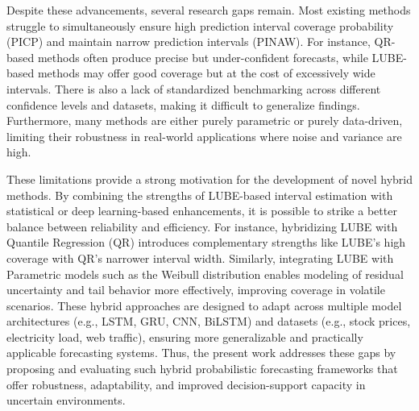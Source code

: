 Despite these advancements, several research gaps remain. Most existing methods struggle to simultaneously ensure high prediction interval coverage probability (PICP) and maintain narrow prediction intervals (PINAW). For instance, QR-based methods often produce precise but under-confident forecasts, while LUBE-based methods may offer good coverage but at the cost of excessively wide intervals. There is also a lack of standardized benchmarking across different confidence levels and datasets, making it difficult to generalize findings. Furthermore, many methods are either purely parametric or purely data-driven, limiting their robustness in real-world applications where noise and variance are high.

These limitations provide a strong motivation for the development of novel hybrid methods. By combining the strengths of LUBE-based interval estimation with statistical or deep learning-based enhancements, it is possible to strike a better balance between reliability and efficiency. For instance, hybridizing LUBE with Quantile Regression (QR) introduces complementary strengths like LUBE's high coverage with QR’s narrower interval width. Similarly, integrating LUBE with Parametric models such as the Weibull distribution enables modeling of residual uncertainty and tail behavior more effectively, improving coverage in volatile scenarios. These hybrid approaches are designed to adapt across multiple model architectures (e.g., LSTM, GRU, CNN, BiLSTM) and datasets (e.g., stock prices, electricity load, web traffic), ensuring more generalizable and practically applicable forecasting systems. Thus, the present work addresses these gaps by proposing and evaluating such hybrid probabilistic forecasting frameworks that offer robustness, adaptability, and improved decision-support capacity in uncertain environments.

